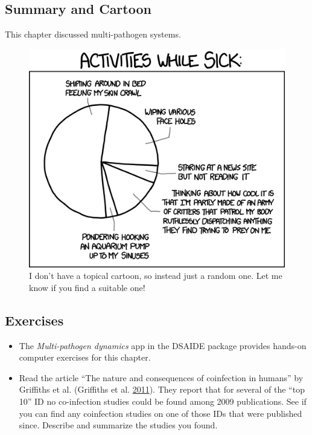 \documentclass[]{article}
\providecommand{\tightlist}{%
  \setlength{\itemsep}{0pt}\setlength{\parskip}{0pt}}
\theoremstyle{definition}
\theoremstyle{definition}
\theoremstyle{definition}
\theoremstyle{remark}
\begin{document}
\subsection{Summary and Cartoon}\label{summary-and-cartoon-10}

This chapter discussed multi-pathogen systems.

\begin{figure}
\centering
\includegraphics{./images/xkcd-sick_day.png}
\caption{I don't have a topical cartoon, so instead just a random one.
Let me know if you find a suitable one!}
\end{figure}

\subsection{Exercises}\label{exercises-10}

\begin{itemize}
\tightlist
\item
  The \emph{Multi-pathogen dynamics} app in the DSAIDE package provides
  hands-on computer exercises for this chapter.
\item
  Read the article ``The nature and consequences of coinfection in
  humans'' by Griffiths et al. (Griffiths et al.
  \protect\hyperlink{ref-griffiths11}{2011}). They report that for
  several of the ``top 10'' ID no co-infection studies could be found
  among 2009 publications. See if you can find any coinfection studies
  on one of those IDs that were published since. Describe and summarize
  the studies you found.
\end{itemize}
\end{document}

